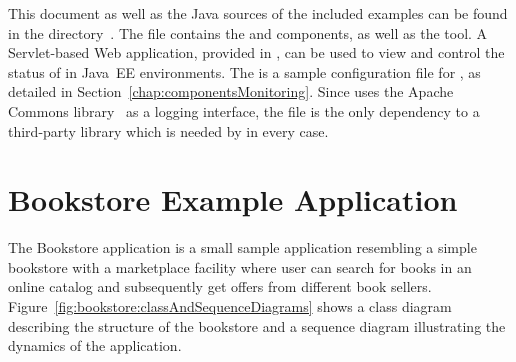 This document as well as the Java sources of the included examples %
can be found in the directory~\dir{\userGuideDir{}/}. %
The file \file{\mainJar{}} contains the \KiekerMonitoringPart{} and %
\KiekerAnalysisPart{} components, as well as the \KiekerTraceAnalysis{} tool. %
A Servlet-based Web application, provided in \file{\servletWar}, can be used %
to view and control the status of \KiekerMonitoringPart{} in Java~EE %
environments. The \file{\kiekerMonitoringProperties{}} is a sample configuration %
file for \KiekerMonitoringPart{}, as detailed in Section~\ref{chap:componentsMonitoring}. %
Since \Kieker{} uses the Apache Commons library~\cite{CommonsLogging-WebSite} %
as a logging interface, the file \file{\commonsLoggingJar} is the only dependency %
to a third-party library which is needed by \Kieker{} in every case. 

\section{Bookstore Example Application}\label{sec:example:bookstore}

The Bookstore application is a small sample application resembling a simple %
bookstore with a marketplace facility where user can search for books in an %
online catalog and subsequently get offers from different book sellers. %
Figure~\ref{fig:bookstore:classAndSequenceDiagrams} shows %
a class diagram describing the structure of the bookstore and %
a sequence diagram illustrating the dynamics of the application. 

